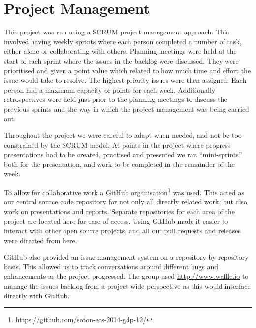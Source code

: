 \chapter{Project Management} 
\label{Chapter: Project Management}
This project was run using a SCRUM project management approach. This involved having weekly sprints where each person completed a number of task, either alone or collaborating with others. Planning meetings were held at the start of each sprint where the issues in the backlog were discussed. They were prioritised and given a point value which related to how much time and effort the issue would take to resolve. The highest priority issues were then assigned. Each person had a maximum capacity of points for each week. Additionally retrospectives were held just prior to the planning meetings to discuss the previous sprints and the way in which the project management was being carried out.

Throughout the project we were careful to adapt when needed, and not be too constrained by the SCRUM model. At points in the project where progress presentations had to be created, practised and presented we ran ``mini-sprints'' both for the presentation, and work to be completed in the remainder of the week.

To allow for collaborative work a GitHub organisation\footnote{\url{https://github.com/soton-ecs-2014-gdp-12/}} was used. This acted as our central source code repository for not only all directly related work, but also work on presentations and reports. Separate repositories for each area of the project are located here for ease of access. Using GitHub made it easier to interact with other open source projects, and all our pull requests and releases were directed from here. 

GitHub also provided an issue management system on a repository by repository basis. This allowed us to track conversations around different bugs and enhancements as the project progressed.
The group used \url{http://www.waffle.io} to manage the issues backlog from a project wide perspective as this would interface directly with GitHub.
